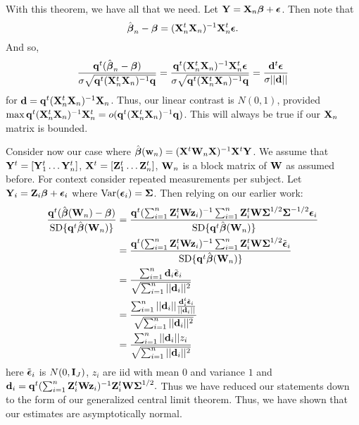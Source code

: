 With this theorem, we have all that we need. Let
$\mathbf{Y} = \mathbf{X}_n \boldsymbol{\beta} + \boldsymbol{\epsilon}$. Then note that
$$
\hat {\boldsymbol{\beta}}_n  - \boldsymbol{\beta} 
= (\mathbf{X}_n^t \mathbf{X}_n)^{-1} \mathbf{X}_n^t \boldsymbol{\epsilon}. 
$$
And so,
$$
\frac{\bq^t(\hat \bbeta_n  - \bbeta)}{\sigma \sqrt{\bq^t (\bX_n^t \bX_n)^{-1} \bq}}=
\frac{\bq^t (\bX_n^t \bX_n)^{-1} \bX_n^t \beps}%
{\sigma \sqrt{\bq^t (\bX_n^t \bX_n)^{-1} \bq}}
= \frac{\bd^t \beps}{\sigma ||\bd||}
$$
for $\mathbf{d} = \mathbf{q}^t (\mathbf{X}_n^t \mathbf{X}_n)^{-1}\mathbf{X}_n$. Thus, our linear contrast
is $N(0,1)$, provided $\max \mathbf{q}^t (\mathbf{X}_n^t \mathbf{X}_n)^{-1}\mathbf{X}_n^t = o(\mathbf{q}^t (\mathbf{X}_n^t \mathbf{X}_n)^{-1} \mathbf{q})$.
This will always be true if our $\mathbf{X}_n$ matrix is bounded.

Consider now our case where $\hat {\boldsymbol{\beta}} (\mathbf{w}_n) = (\mathbf{X}^t \mathbf{W}_n \mathbf{X})^{-1} \mathbf{X}^t \mathbf{Y}$. We
assume that $\mathbf{Y}^t = [\mathbf{Y}_1^t \ldots \mathbf{Y}_n^t]$, $\mathbf{X}^t = [\mathbf{Z}_1^t \ldots \mathbf{Z}_n^t]$,
$\mathbf{W}_n$ is a block matrix of $\mathbf{W}$ as assumed before. For context consider repeated measurements
per subject. Let $\mathbf{Y}_i = \mathbf{Z}_i \boldsymbol{\beta} + \boldsymbol{\epsilon}_i$ where $\mbox{Var}(\boldsymbol{\epsilon}_i) = \boldsymbol{\Sigma}$. Then
relying on our earlier work:
\begin{align*}
\frac{\bq^t (\hat \bbeta(\bW_n) - \bbeta)}{\mbox{SD}\{\bq^t \hat \bbeta(\bW_n)\}}
& =  \frac{\bq^t(\sum_{i=1}^n \bZ_i^t \bW \bz_i)^{-1}\sum_{i=1}^n \bZ_i^t \bW \bSigma^{1/2} \bSigma^{-1/2} \beps_i}%
{\mbox{SD}\{\bq^t \hat \bbeta(\bW_n)\}} \\
& = \frac{\bq^t(\sum_{i=1}^n \bZ_i^t \bW \bz_i)^{-1}\sum_{i=1}^n \bZ_i^t \bW \bSigma^{1/2} \tilde \beps_i}%
{\mbox{SD}\{\bq^t \hat \bbeta(\bW_n)\}} \\
& = \frac{\sum_{i=1}^n \bd_{i} \tilde \beps_i}{\sqrt{\sum_{i=1}^n ||\bd_i ||^2}} \\
& = \frac{\sum_{i=1}^n ||\bd_i|| \frac{\bd_i^t \tilde \beps_i}{||\bd_i||}}{\sqrt{\sum_{i=1}^n ||\bd_i ||^2}} \\
& = \frac{\sum_{i=1}^n ||\bd_i|| z_i}{\sqrt{\sum_{i=1}^n ||\bd_i ||^2}} 
\end{align*}
here $\tilde {\boldsymbol{\epsilon}}_i$ is $N(0,\mathbf{I}_{J})$, $z_i$ are iid with mean $0$ and variance $1$ and
$
\mathbf{d}_i = \mathbf{q}^t(\sum_{i=1}^n \mathbf{Z}_i^t \mathbf{W} \mathbf{z}_i)^{-1} \mathbf{Z}_i^t \mathbf{W} \boldsymbol{\Sigma}^{1/2}.
$
Thus we have reduced our statements down to the form of our generalized central limit theorem. 
Thus, we have shown that our estimates are asymptotically normal.

